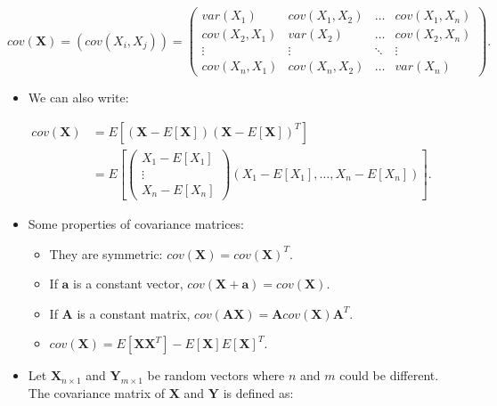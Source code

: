\documentclass[
  12pt,
]{book}
\providecommand{\tightlist}{%
  \setlength{\itemsep}{0pt}\setlength{\parskip}{0pt}}
\begin{document}
\[
cov(\boldsymbol{X}) = (cov(X_i, X_j)) =
\left(\begin{array}{cccc} var(X_1)      & cov(X_1, X_2) & \ldots & cov(X_1, X_n) \\
                          cov(X_2, X_1) & var(X_2)      & \ldots & cov(X_2, X_n) \\
                          \vdots        & \vdots        & \ddots & \vdots        \\
                          cov(X_n, X_1) & cov(X_n, X_2) & \ldots & var(X_n) \end{array}\right).
\]

\begin{itemize}
\tightlist
\item
  We can also write:
\end{itemize}

\[\begin{aligned}
cov(\boldsymbol{X}) &= E[(\boldsymbol{X} - E[\boldsymbol{X}])(\boldsymbol{X} - E[\boldsymbol{X}])^T] \\
&= E\left[ \left(\begin{array}{c} X_1 - E[X_1] \\ \vdots \\ X_n - E[X_n] \end{array}\right) \left( X_1 - E[X_1], \ldots, X_n - E[X_n] \right) \right].
\end{aligned}\]

\begin{itemize}
\item
  Some properties of covariance matrices:

  \begin{itemize}
  \item
    They are symmetric: \(cov(\boldsymbol{X}) = cov(\boldsymbol{X})^T\).
  \item
    If \(\boldsymbol{a}\) is a constant vector, \(cov(\boldsymbol{X} + \boldsymbol{a}) = cov(\boldsymbol{X})\).
  \item
    If \(\boldsymbol{A}\) is a constant matrix, \(cov(\boldsymbol{A} \boldsymbol{X}) = \boldsymbol{A} cov(\boldsymbol{X}) \boldsymbol{A}^T\).
  \item
    \(cov(\boldsymbol{X}) = E[\boldsymbol{X} \boldsymbol{X}^T] - E[\boldsymbol{X}]  E[\boldsymbol{X}]^T\).
  \end{itemize}
\item
  Let \(\boldsymbol{X}_{n \times 1}\) and \(\boldsymbol{Y}_{m \times 1}\) be random vectors where \(n\) and \(m\) could be different. The covariance matrix of \(\boldsymbol{X}\) and \(\boldsymbol{Y}\) is defined as:
\end{itemize}
\end{document}
